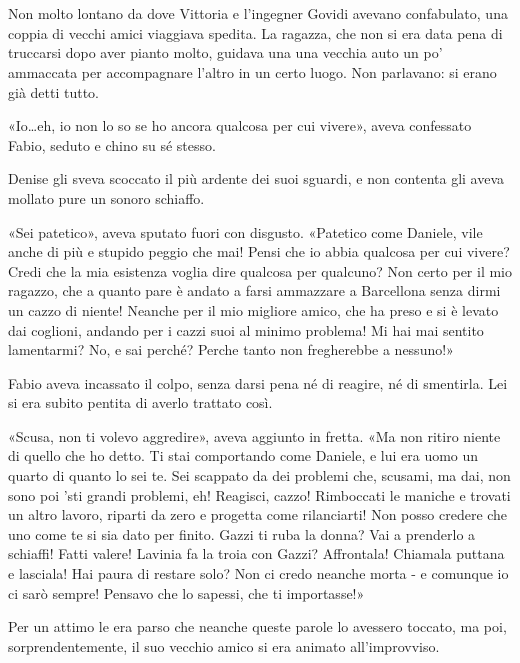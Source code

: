 \chapter{}

Non molto lontano da dove Vittoria e l'ingegner Govidi avevano confabulato, una coppia di vecchi amici viaggiava spedita. La ragazza, che non si era data pena di truccarsi dopo aver pianto molto, guidava una una vecchia auto un po' ammaccata per accompagnare l'altro in un certo luogo. Non parlavano: si erano già detti tutto.

«Io\ldots eh, io non lo so se ho ancora qualcosa per cui vivere», aveva confessato Fabio, seduto e chino su sé stesso.

Denise gli sveva scoccato il più ardente dei suoi sguardi, e non contenta gli aveva mollato pure un sonoro schiaffo.

«Sei patetico», aveva sputato fuori con disgusto. «Patetico come Daniele, vile anche di più e stupido peggio che mai! Pensi che io abbia qualcosa per cui vivere? Credi che la mia esistenza voglia dire qualcosa per qualcuno? Non certo per il mio ragazzo, che a quanto pare è andato a farsi ammazzare a Barcellona senza dirmi un cazzo di niente! Neanche per il mio migliore amico, che ha preso e si è levato dai coglioni, andando per i cazzi suoi al minimo problema! Mi hai mai sentito lamentarmi? No, e sai perché? Perche tanto non fregherebbe a nessuno!»

Fabio aveva incassato il colpo, senza darsi pena né di reagire, né di smentirla. Lei si era subito pentita di averlo trattato così.

«Scusa, non ti volevo aggredire», aveva aggiunto in fretta. «Ma non ritiro niente di quello che ho detto. Ti stai comportando come Daniele, e lui era uomo un quarto di quanto lo sei te. Sei scappato da dei problemi che, scusami, ma dai, non sono poi 'sti grandi problemi, eh! Reagisci, cazzo! Rimboccati le maniche e trovati un altro lavoro, riparti da zero e progetta come rilanciarti! Non posso credere che uno come te si sia dato per finito. Gazzi ti ruba la donna? Vai a prenderlo a schiaffi! Fatti valere! Lavinia fa la troia con Gazzi? Affrontala! Chiamala puttana e lasciala! Hai paura di restare solo? Non ci credo neanche morta - e comunque io ci sarò sempre! Pensavo che lo sapessi, che ti importasse!»

Per un attimo le era parso che neanche queste parole lo avessero toccato, ma poi, sorprendentemente, il suo vecchio amico si era animato all'improvviso.

